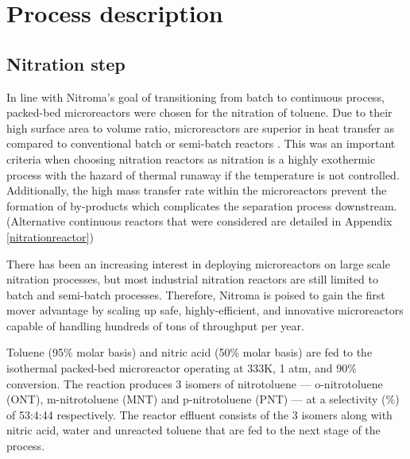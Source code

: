 \section{Process description}
\label{sec:process}
\subsection{Nitration step}
In line with Nitroma's goal of transitioning from batch to continuous process, packed-bed microreactors were chosen for the nitration of toluene. Due to their high surface area to volume ratio, microreactors are superior in heat transfer as compared to conventional batch or semi-batch reactors \cite{halder_nitration_2007}. This was an important criteria when choosing nitration reactors as nitration is a highly exothermic process with the hazard of thermal runaway if the temperature is not controlled. Additionally, the high mass transfer rate within the microreactors prevent the formation of by-products \cite{halder_nitration_2007} which complicates the separation process downstream.
(Alternative continuous reactors that were considered are detailed in Appendix \ref{nitrationreactor})

There has been an increasing interest in deploying microreactors on large scale nitration processes, but most industrial nitration reactors are still limited to batch and semi-batch processes. Therefore, Nitroma is poised to gain the first mover advantage by scaling up safe, highly-efficient, and innovative microreactors capable of handling hundreds of tons of throughput per year.

Toluene (95\% molar basis) and nitric acid (50\% molar basis) are fed to the isothermal packed-bed microreactor operating at 333K, 1 atm, and 90\% conversion. The reaction produces 3 isomers of nitrotoluene --- o-nitrotoluene (ONT), m-nitrotoluene (MNT) and p-nitrotoluene (PNT) --- at a selectivity (\%) of 53:4:44 respectively. The reactor effluent consists of the 3 isomers along with nitric acid, water and unreacted toluene that are fed to the next stage of the process.

